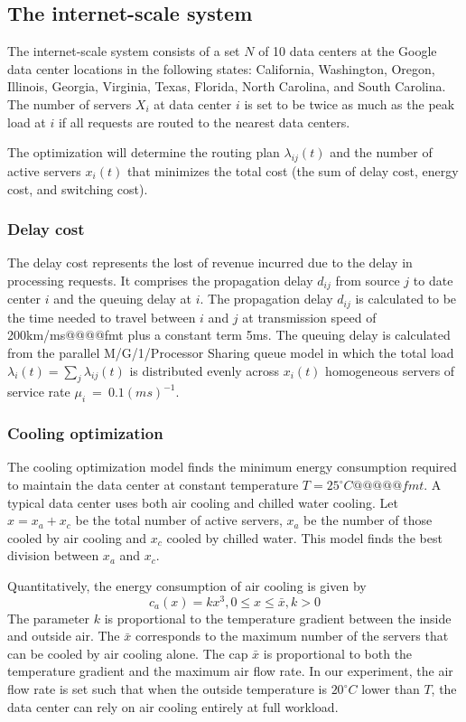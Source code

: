 \documentclass{acm_proc_article-sp}
\begin{document}
\subsection{The internet-scale system}
The internet-scale system consists of a set $N$ of 10 data centers at the Google data center locations in the following states: California, Washington, Oregon, Illinois, Georgia, Virginia, Texas, Florida, North Carolina, and South Carolina. The number of servers $X_i$ at data center $i$ is set to be twice as much as the peak load at $i$ if all requests are routed to the nearest data centers.

The optimization will determine the routing plan $\lambda_{ij}(t)$ and the number of active servers $x_i(t)$ that minimizes the total cost (the sum of delay cost, energy cost, and switching cost).

\subsubsection{Delay cost}
The delay cost represents the lost of revenue incurred due to the delay in processing requests. It comprises the propagation delay $d_{ij}$ from source $j$ to date center $i$ and the queuing delay at $i$.
The propagation delay $d_{ij}$ is calculated to be the time needed to travel between $i$ and $j$ at transmission speed of 200km/ms@@@@fmt plus a constant term 5ms. The queuing delay is calculated from the parallel M/G/1/Processor Sharing queue model in which the total load $\lambda_i(t)=\sum_j \lambda_{ij}(t)$ is distributed evenly across $x_i(t)$ homogeneous servers of service rate \mbox{$\mu_i$ = $0.1(ms)^{-1}$}.

\subsubsection{Cooling optimization}
The cooling optimization model finds the minimum energy consumption required to maintain the data center at constant temperature $T = 25^{\circ}C@@@@@fmt$. A typical data center uses both air cooling and chilled water cooling. Let $x = x_a + x_c$ be the total number of active servers, $x_a$ be the number of those cooled by air cooling and $x_c$ cooled by chilled water. This model finds the best division between $x_a$ and $x_c$.

Quantitatively, the energy consumption of air cooling is given by
\begin{equation}
c_a(x) = kx^3, 0 \leq x \leq \bar{x}, k > 0
\end{equation}
The parameter $k$ is proportional to the temperature gradient between the inside and outside air. The $\bar{x}$ corresponds to the maximum number of the servers that can be cooled by air cooling alone. The cap $\bar{x}$ is proportional to both the temperature gradient and the maximum air flow rate. In our experiment, the air flow rate is set such that when the outside temperature is $20^{\circ}C$ lower than $T$, the data center can rely on air cooling entirely at full workload.
\end{document}

